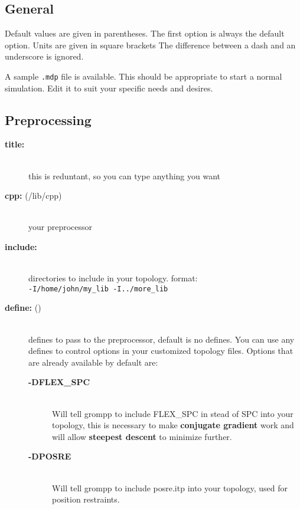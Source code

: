 \subsection{ General}

Default values are given in parentheses. The first option is
always the default option. Units are given in square brackets The
difference between a dash and an underscore is ignored. 

A sample {\tt .mdp} file is
available. This should be appropriate to start a normal
simulation. Edit it to suit your specific needs and desires. 

\subsection{ Preprocessing}
\begin{description}
\item[{\bf title:}]\mbox{}\\
this is reduntant, so you can type anything you want
\item[{\bf cpp: }(/lib/cpp)]\mbox{}\\
your preprocessor
\item[{\bf include:}]\mbox{}\\
directories to include in your topology. format: 
\\{\tt-I/home/john/my\_lib -I../more\_lib}\\
\item[{\bf define: }()]\mbox{}\\
defines to pass to the preprocessor, default is no defines. You can use
any defines to control options in your customized topology files. Options
that are already available by default are:
\vspace{-2ex}\begin{description}
\item[{\bf -DFLEX\_SPC}]\mbox{}\\
Will tell grompp to include FLEX\_SPC in stead of SPC into your
topology, this is necessary to make 
{\bf conjugate gradient} work and will allow 
{\bf steepest descent} to minimize further.
\item[{\bf -DPOSRE}]\mbox{}\\
Will tell grompp to include posre.itp into your topology, used for
position restraints.
\end{description}
\end{description}

